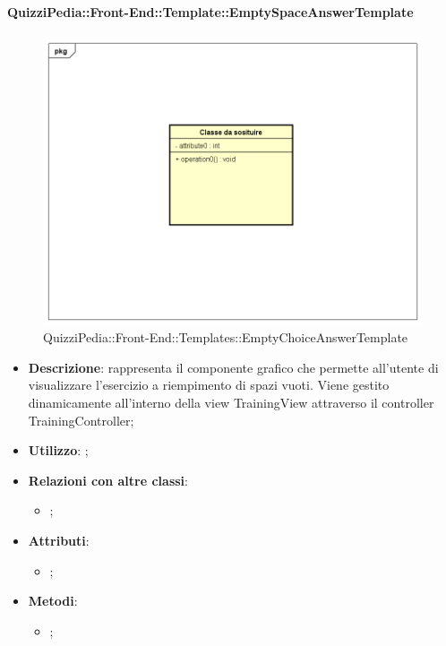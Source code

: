 		\paragraph{QuizziPedia::Front-End::Template::EmptySpaceAnswerTemplate}
		
				\label{QuizziPedia::Front-End::Templates::EmptyChoiceAnswerTemplate}

				\begin{figure}[h]
					\centering
					\includegraphics[scale=0.5,keepaspectratio]{UML/Classi/Front-End/Temporanea.png}
					\caption{QuizziPedia::Front-End::Templates::EmptyChoiceAnswerTemplate}
				\end{figure}
		
			\begin{itemize}
				\item \textbf{Descrizione}: rappresenta il componente grafico che permette all'utente di visualizzare l'esercizio a riempimento di spazi vuoti. Viene gestito dinamicamente all'interno della view TrainingView attraverso il controller TrainingController;
				\item \textbf{Utilizzo}: ;
				\item \textbf{Relazioni con altre classi}: 
				\begin{itemize}
					\item ;
				\end{itemize}
				\item \textbf{Attributi}: 
				\begin{itemize}
					\item ;
				\end{itemize}
				\item \textbf{Metodi}: 
				\begin{itemize}
					\item ;
				\end{itemize}
			\end{itemize}
		
